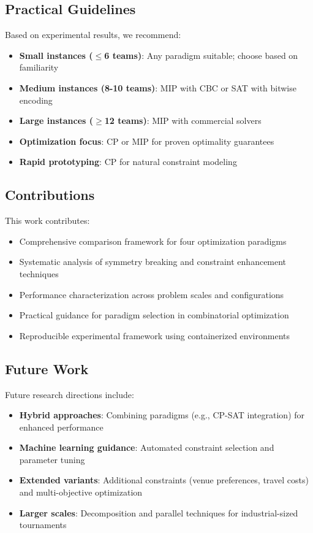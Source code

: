 \documentclass[11pt]{article}
\begin{document}
\subsection{Practical Guidelines}

Based on experimental results, we recommend:

\begin{itemize}
    \item \textbf{Small instances ($\leq$6 teams)}: Any paradigm suitable; choose based on familiarity
    \item \textbf{Medium instances (8-10 teams)}: MIP with CBC or SAT with bitwise encoding
    \item \textbf{Large instances ($\geq$12 teams)}: MIP with commercial solvers
    \item \textbf{Optimization focus}: CP or MIP for proven optimality guarantees
    \item \textbf{Rapid prototyping}: CP for natural constraint modeling
\end{itemize}

\subsection{Contributions}

This work contributes:
\begin{itemize}
    \item Comprehensive comparison framework for four optimization paradigms
    \item Systematic analysis of symmetry breaking and constraint enhancement techniques
    \item Performance characterization across problem scales and configurations
    \item Practical guidance for paradigm selection in combinatorial optimization
    \item Reproducible experimental framework using containerized environments
\end{itemize}

\subsection{Future Work}

Future research directions include:
\begin{itemize}
    \item \textbf{Hybrid approaches}: Combining paradigms (e.g., CP-SAT integration) for enhanced performance
    \item \textbf{Machine learning guidance}: Automated constraint selection and parameter tuning
    \item \textbf{Extended variants}: Additional constraints (venue preferences, travel costs) and multi-objective optimization
    \item \textbf{Larger scales}: Decomposition and parallel techniques for industrial-sized tournaments
\end{itemize}
\end{document}

